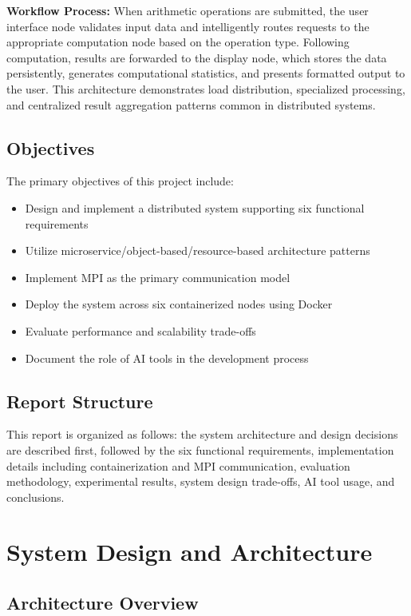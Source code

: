 \documentclass{article}
\begin{document}
\textbf{Workflow Process:} When arithmetic operations are submitted, the user interface node validates input data and intelligently routes requests to the appropriate computation node based on the operation type. Following computation, results are forwarded to the display node, which stores the data persistently, generates computational statistics, and presents formatted output to the user. This architecture demonstrates load distribution, specialized processing, and centralized result aggregation patterns common in distributed systems.


\subsection{Objectives}
The primary objectives of this project include:
\begin{itemize}
    \item Design and implement a distributed system supporting six functional requirements
    \item Utilize microservice/object-based/resource-based architecture patterns
    \item Implement MPI as the primary communication model
    \item Deploy the system across six containerized nodes using Docker
    \item Evaluate performance and scalability trade-offs
    \item Document the role of AI tools in the development process
\end{itemize}

\subsection{Report Structure}
This report is organized as follows: the system architecture and design decisions are described first, followed by the six functional requirements, implementation details including containerization and MPI communication, evaluation methodology, experimental results, system design trade-offs, AI tool usage, and conclusions.

\section{System Design and Architecture}

\subsection{Architecture Overview}
\end{document}
